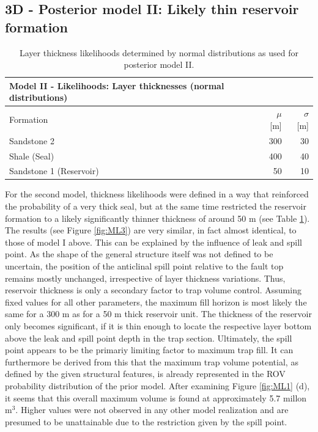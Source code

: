 		\subsection{3D - Posterior model II: Likely thin reservoir formation}%
		\begin{table}[h]
			\centering
			\begin{tabular}{lrr} 
				\toprule
				Model II - Likelihoods: Layer thicknesses (normal distributions)\\  
				\midrule 
				Formation & $\mu$ [m] & $\sigma$ [m]\\ 
				\midrule 
				Sandstone 2 & 300 & 30 \\
				Shale (Seal) & 400 & 40\\ 
				Sandstone 1 (Reservoir) & 50 & 10 \\
				\bottomrule
			\end{tabular}
			\caption{Layer thickness likelihoods determined by normal distributions as used for posterior model II.}
			\label{tab:ML3_likelihoods}
		\end{table}
		For the second model, thickness likelihoods were defined in a way that reinforced the probability of a very thick seal, but at the same time restricted the reservoir formation to a likely significantly thinner thickness of around 50 m (see Table \ref{tab:ML3_likelihoods}). The results (see Figure \ref{fig:ML3}) are very similar, in fact almost identical, to those of model I above. This can be explained by the influence of leak and spill point. As the shape of the general structure itself was not defined to be uncertain, the position of the anticlinal spill point relative to the fault top remains mostly unchanged, irrespective of layer thickness variations. Thus, reservoir thickness is only a secondary factor to trap volume control. Assuming fixed values for all other parameters, the maximum fill horizon is most likely the same for a 300 m as for a 50 m thick reservoir unit. The thickness of the reservoir only becomes significant, if it is thin enough to locate the respective layer bottom above the leak and spill point depth in the trap section. Ultimately, the spill point appears to be the primariy limiting factor to maximum trap fill. It can furthermore be derived from this that the maximum trap volume potential, as defined by the given structural features, is already represented in the ROV probability distribution of the prior model. After examining Figure \ref{fig:ML1} (d), it seems that this overall maximum volume is found at approximately 5.7 millon m$^3$. Higher values were not observed in any other model realization and are presumed to be unattainable due to the restriction given by the spill point.
	
